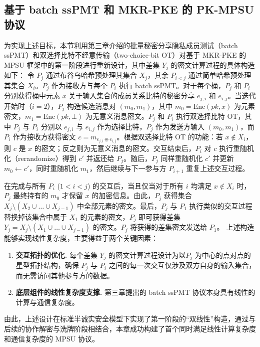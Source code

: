 \subsection{基于 batch ssPMT 和  MKR-PKE 的 PK-MPSU 协议}

为实现上述目标，本节利用第三章介绍的批量秘密分享隐私成员测试（batch ssPMT）和双选择比特不经意传输（two-choice-bit OT）对基于 MKR-PKE 的 MPSU 框架中的第一阶段进行重新设计，其中差集 $Y_j$ 的密文计算过程的具体构造如下：
令 $P_j$ 通过布谷鸟哈希预处理其集合 $X_j$，其余 $P_{i<j}$ 通过简单哈希预处理其集合 $X_i$。$P_j$ 作为接收方与每个 $P_i$ 执行 batch ssPMT。对于每个桶，$P_j$ 和 $P_i$ 分别获得桶中元素 $x$ 关于输入集合的成员关系比特的秘密分享 $e_{j,i}$ 和 $e_{i,j}$。当迭代开始时（$i=2$），$P_j$ 构造候选消息对 $(m_0, m_1)$，其中 $m_0 = \text{Enc}(pk, x)$ 为元素密文，$m_1 = \text{Enc}(pk, \bot)$ 为无意义消息密文。$P_j$ 和 $P_i$ 执行双选择比特 OT，其中 $P_j$ 与 $P_i$ 分别以 $e_{j,i}$ 与 $e_{i,j}$ 作为选择比特，$P_j$ 作为发送方输入 $(m_0, m_1)$，而 $P_i$ 作为接收方获得密文 $c = m_{e_{j,i} \oplus e_{i,j}}$。根据双选择比特 OT 的功能：若 $x \notin X_i$，则 $c$ 是 $x$ 的密文；反之则为无意义消息的密文。交互结束后，$P_i$ 对 $c$ 执行重随机化（rerandomize）得到 $c'$ 并返还给 $P_j$。随后，$P_j$ 同样重随机化 $c'$ 并更新 $m_0 \leftarrow c'$，同时重随机化 $m_1$，然后继续与下一参与方 $P_{i+1}$ 重复上述交互过程。

在完成与所有 $P_i$ ($1 < i < j$) 的交互后，当且仅当对于所有 $i$ 均满足 $x \notin X_i$ 时，$P_j$ 最终持有的 $m_0$ 才保留 $x$ 的加密信息。由此，$P_j$ 获得集合 $X_j \setminus (X_2 \cup \dots \cup X_{j-1})$ 中全部元素的密文。最后，$P_j$ 与 $P_1$ 执行类似的交互过程替换掉该集合中属于 $X_1$ 的元素的密文，$P_j$ 即可获得差集 $Y_j = X_j \setminus (X_1 \cup \dots \cup X_{j-1})$ 的密文。$P_j$ 将获得的差集密文发送给 $P_1$。
上述构造能够实现线性复杂度，主要得益于两个关键因素：
\begin{enumerate}
    \item \textbf{交互拓扑的优化.} 每个差集 $Y_j$ 的密文计算过程设计为以$P_j$ 为中心的点对点的星型拓扑结构，确保 $P_j$ 与 $P_i$ 之间的每一次交互仅涉及双方自身的输入集合，而无需访问其他参与方的数据。
    \item \textbf{底层组件的线性复杂度支撑.} 第三章提出的 batch ssPMT 协议本身具有线性的计算与通信复杂度。
\end{enumerate}
由此，上述设计在标准半诚实安全模型下实现了第一阶段的“双线性”构造，通过与后续的协作解密与洗牌阶段相结合，本章成功构建了首个同时满足线性计算复杂度和通信复杂度的 MPSU 协议。

